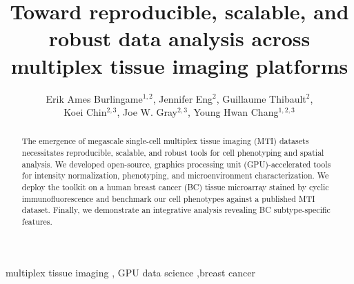 \documentclass[preprint,review,3p,12pt]{elsarticle}
\begin{document}
\begin{frontmatter}


\title{Toward reproducible, scalable, and robust data analysis across multiplex tissue imaging platforms
}




\author{Erik Ames Burlingame$^{1,2}$, Jennifer Eng$^{2}$, Guillaume Thibault$^{2}$, \\ Koei Chin$^{2,3}$, Joe W. Gray$^{2,3}$, Young Hwan Chang$^{1,2,3}$}

\address{$^{1}$Computational Biology Program, Department of Biomedical Engineering, Oregon Health and Science University, Portland, OR, USA}
\address{$^{2}$OHSU Center for Spatial Systems Biomedicine, Department of Biomedical Engineering, Oregon Health and Science University, Portland, OR, USA}
\address{$^{3}$Knight Cancer Institute, Oregon Health and Science University, Portland, OR, USA}
\begin{abstract}
The emergence of megascale single-cell multiplex tissue imaging (MTI) datasets necessitates reproducible, scalable, and robust tools for cell phenotyping and spatial analysis. We developed open-source, graphics processing unit (GPU)-accelerated tools for intensity normalization, phenotyping, and microenvironment characterization. We deploy the toolkit on a human breast cancer (BC) tissue microarray stained by cyclic immunofluorescence and benchmark our cell phenotypes against a published MTI dataset. Finally, we demonstrate an integrative analysis revealing BC subtype-specific features.
\end{abstract}

\begin{keyword}
multiplex tissue imaging \sep 
GPU data science \sep breast cancer


\end{keyword}

\end{frontmatter}
\end{document}
